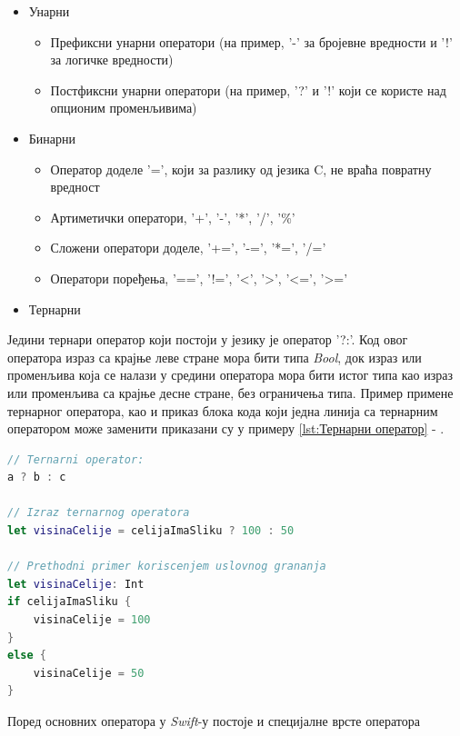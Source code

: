 \documentclass[12pt,oneside]{memoir}
\begin{document}
\begin{itemize}
  \item Унарни
  
\begin{itemize}
    \item Префиксни унарни оператори (на пример, '-' за бројевне вредности и '!' за логичке вредности)  
    \item Постфиксни унарни оператори (на пример, '?' и '!' који се користе над опционим променљивима)
\end{itemize}
  
  \item Бинарни 
  
\begin{itemize}
    \item Оператор доделе '=', који за разлику од језика C, не враћа повратну вредност  
    \item Артиметички оператори, '+', '-', '*', '/', '\%'
    \item Сложени оператори доделе, '+=', '-=', '*=', '/='
    \item Оператори поређења, '==', '!=', '<', '>', '<=', '>='
\end{itemize}
 
  \item Тернарни
\end{itemize}

  \indent Једини тернари оператор који постоји у језику је оператор '?:'. Код овог оператора израз са крајње леве стране мора бити типа \textit{Bool}, док израз или променљива која се налази у средини оператора мора бити истог типа као израз или променљива са крајње десне стране, без ограничења типа. Пример примене тернарног оператора, као и приказ блока кода који једна линија са тернарним оператором може заменити приказани су у примеру \ref{lst:Тернарни оператор} - .
  
\begin{lstlisting}[caption=\textit{{Тернарни оператор}}, label={lst:Тернарни оператор}, language=Swift, frame=single]
// Ternarni operator:
a ? b : c

// Izraz ternarnog operatora 
let visinaCelije = celijaImaSliku ? 100 : 50

// Prethodni primer koriscenjem uslovnog grananja
let visinaCelije: Int
if celijaImaSliku {
    visinaCelije = 100
}
else {
    visinaCelije = 50
}
\end{lstlisting}

\indent Поред основних оператора у \textit{Swift}-у постоје и специјалне врсте оператора
\end{document}
